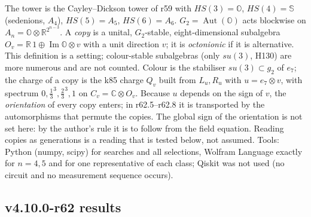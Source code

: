 The tower is the Cayley--Dickson tower of r59 with \(HS(3)=\mathbb O\), \(HS(4)=\mathbb S\) (sedenions, \(A_4\)), \(HS(5)=A_5\), \(HS(6)=A_6\).
\(G_2=\operatorname{Aut}(\mathbb O)\) acts blockwise on \(A_n=\mathbb O\otimes\mathbb R^{2^{n-3}}\).  A \emph{copy} is a unital, \(G_2\)-stable,
eight-dimensional subalgebra \(O_v=\mathbb R\,1\oplus\operatorname{Im}\mathbb O\otimes v\) with a unit direction \(v\); it is \emph{octonionic} if
it is alternative.  This definition is a setting; colour-stable subalgebras (only \(su(3)\), H130) are more numerous and are not counted.
Colour is the stabiliser \(su(3)\subset g_2\) of \(e_7\); the charge of a copy is the k85 charge \(Q_v\) built from \(L_u,R_u\) with
\(u=e_7\otimes v\), with spectrum \(0,\tfrac13^3,\tfrac23^3,1\) on \(C_v=\mathbb C\otimes O_v\).  Because \(u\) depends on the sign of \(v\), the
\emph{orientation} of every copy enters; in r62.5--r62.8 it is transported by the automorphisms that permute the copies.  The global sign of the
orientation is not set here: by the author's rule it is to follow from the field equation.  Reading copies as generations is a reading that is
tested below, not assumed.  Tools: Python (numpy, scipy) for searches and all selections, Wolfram Language exactly for \(n=4,5\) and for one
representative of each class; Qiskit was not used (no circuit and no measurement sequence occurs).

\subsection*{v4.10.0-r62 results}
\label{subsec:v4100-r62-results}

